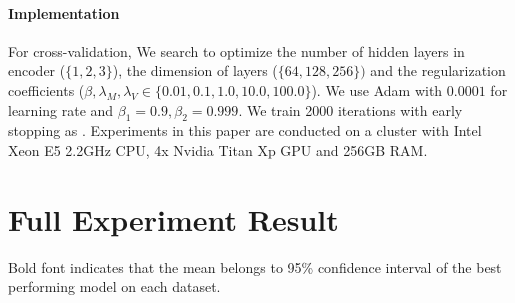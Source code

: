 \documentclass{article}
\begin{document}
    \paragraph{Implementation} For cross-validation, We search to optimize the number of hidden layers in encoder ($\{1,2,3\}$), the dimension of layers ($\{64, 128, 256 \})$ and the regularization coefficients ($\beta, \lambda_{M}, \lambda_{V} \in \{ 0.01, 0.1, 1.0, 10.0, 100.0\}$). We use Adam\cite{Kingma2015} with $0.0001$ for learning rate and $\beta_1 = 0.9, \beta_2 = 0.999$. We train 2000 iterations with early stopping as \cite{Shalit17, yao2018}. Experiments in this paper are conducted on a cluster with Intel Xeon E5 2.2GHz CPU, 4x Nvidia Titan Xp GPU and 256GB RAM.
    
\section{Full Experiment Result}
Bold font indicates that the mean belongs to 95\% confidence interval of the best performing model on each dataset.
\end{document}
